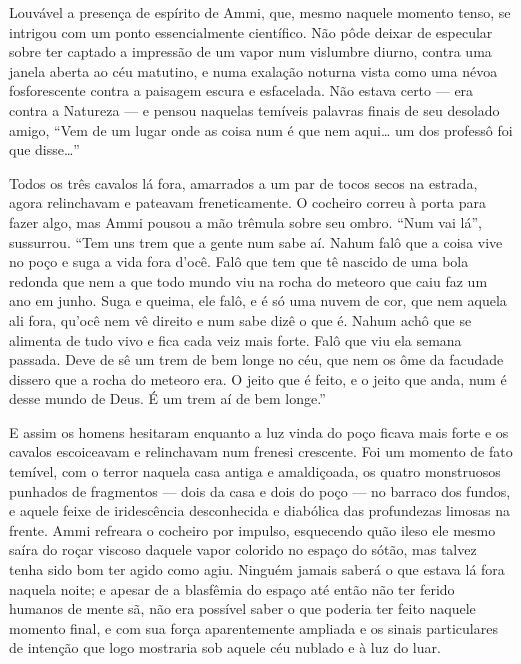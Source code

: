 Louvável a presença de espírito de Ammi, que, mesmo naquele momento
tenso, se intrigou com um ponto essencialmente científico. Não pôde
deixar de especular sobre ter captado a impressão de um vapor num
vislumbre diurno, contra uma janela aberta ao céu matutino, e numa
exalação noturna vista como uma névoa fosforescente contra a paisagem
escura e esfacelada. Não estava certo --- era contra a Natureza --- e
pensou naquelas temíveis palavras finais de seu desolado amigo, ``Vem de
um lugar onde as coisa num é que nem aqui\ldots{} um dos professô foi que
disse\ldots{}''

Todos os três cavalos lá fora, amarrados a um par de tocos secos na
estrada, agora relinchavam e pateavam freneticamente. O cocheiro correu
à porta para fazer algo, mas Ammi pousou a mão trêmula sobre seu ombro.
``Num vai lá'', sussurrou. ``Tem uns trem que a gente num sabe aí. Nahum
falô que a coisa vive no poço e suga a vida fora d'ocê. Falô que tem que
tê nascido de uma bola redonda que nem a que todo mundo viu na rocha do
meteoro que caiu faz um ano em junho. Suga e queima, ele falô, e é só 
uma nuvem de cor, que nem aquela ali fora, qu'ocê nem vê direito e num
sabe dizê o que é. Nahum achô que se alimenta de tudo vivo e fica cada
veiz mais forte. Falô que viu ela semana passada. Deve de sê um trem de
bem longe no céu, que nem os ôme da facudade dissero que a rocha do
meteoro era. O jeito que é feito, e o jeito que anda, num é desse mundo
de Deus. É um trem aí de bem longe.''

E assim os homens hesitaram enquanto a luz vinda do poço ficava mais
forte e os cavalos escoiceavam e relinchavam num frenesi crescente. Foi
um momento de fato temível, com o terror naquela casa antiga e
amaldiçoada, os quatro monstruosos punhados de fragmentos --- dois da
casa e dois do poço --- no barraco dos fundos, e aquele feixe de
iridescência desconhecida e diabólica das profundezas limosas na frente.
Ammi refreara o cocheiro por impulso, esquecendo quão ileso ele mesmo
saíra do roçar viscoso daquele vapor colorido no espaço do sótão, mas
talvez tenha sido bom ter agido como agiu. Ninguém jamais saberá o que
estava lá fora naquela noite; e apesar de a blasfêmia do espaço até
então não ter ferido humanos de mente sã, não era possível saber o que
poderia ter feito naquele momento final, e com sua força aparentemente
ampliada e os sinais particulares de intenção que logo mostraria sob
aquele céu nublado e à luz do luar.

